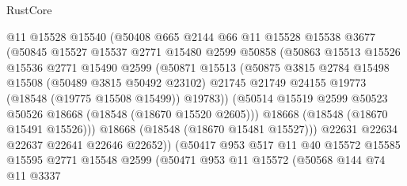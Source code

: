 \begin{lexlean}{RustCore}
\begin{coremodule}
                      @11
                      @15528
                      @15540
                      (@50408
                        @665
                        @2144
                        @66
                        @11
                        @15528
                        @15538
                        @3677
                        (@50845
                          @15527
                          @15537
                          @2771
                          @15480
                          @2599
                          @50858
                          (@50863
                            @15513
                            @15526
                            @15536
                            @2771
                            @15490
                            @2599
                            (@50871
                              @15513
                              (@50875
                                @3815
                                @2784
                                @15498
                                @15508
                                (@50489 @3815 @50492 @23102)
                                @21745
                                @21749
                                @24155
                                @19773
                                (@18548 (@19775 @15508 @15499))
                                @19783))
                            (@50514
                              @15519
                              @2599
                              @50523
                              @50526
                              @18668
                              (@18548 (@18670 @15520 @2605)))
                            @18668
                            (@18548 (@18670 @15491 @15526)))
                          @18668
                          (@18548 (@18670 @15481 @15527)))
                        @22631
                        @22634
                        @22637
                        @22641
                        @22646
                        @22652))
                    (@50417
                      @953
                      @517
                      @11
                      @40
                      @15572
                      @15585
                      @15595
                      @2771
                      @15548
                      @2599
                      (@50471
                        @953
                        @11
                        @15572
                        (@50568
                          @144
                          @74
                          @11
                          @3337

\end{coremodule}
\end{lexlean}
